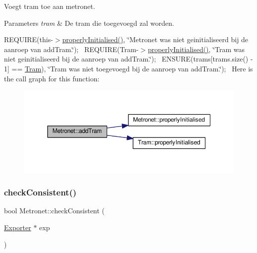 Voegt tram toe aan metronet. 


\begin{DoxyParams}{Parameters}
{\em tram} & De tram die toegevoegd zal worden.\\
\hline
\end{DoxyParams}
R\+E\+Q\+U\+I\+RE(this-\/$>$\hyperlink{class_metronet_a3d2adce29a947f162924279b766de645}{properly\+Initialised()}, \char`\"{}\+Metronet was niet geinitialiseerd bij de aanroep van add\+Tram.\char`\"{});~\newline
R\+E\+Q\+U\+I\+RE(Tram-\/$>$\hyperlink{class_metronet_a3d2adce29a947f162924279b766de645}{properly\+Initialised()}, \char`\"{}\+Tram was niet geinitialiseerd bij de aanroep van add\+Tram.\char`\"{});~\newline
E\+N\+S\+U\+RE(trams\mbox{[}trams.\+size() -\/ 1\mbox{]} == \hyperlink{class_tram}{Tram}), \char`\"{}\+Tram was niet toegevoegd bij de aanroep van add\+Tram.\char`\"{});~\newline
Here is the call graph for this function\+:\nopagebreak
\begin{figure}[H]
\begin{center}
\leavevmode
\includegraphics[width=350pt]{class_metronet_a3a01132772f4a367d83af40a3c02e224_cgraph}
\end{center}
\end{figure}
\mbox{\label{class_metronet_a0128de167ec0a36e70abd57170b3faed}} 
\subsubsection{\texorpdfstring{check\+Consistent()}{checkConsistent()}}
{\footnotesize\ttfamily bool Metronet\+::check\+Consistent (\begin{DoxyParamCaption}\item[{\hyperlink{class_exporter}{Exporter} $\ast$}]{exp }\end{DoxyParamCaption})}



